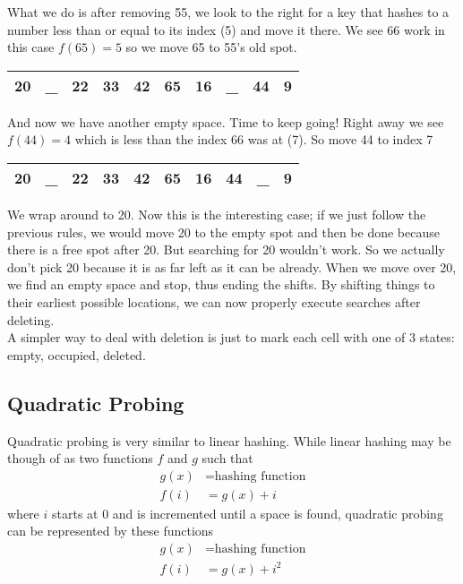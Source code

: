 \documentclass[11pt]{book}
\begin{document}
		\noindent What we do is after removing 55, we look to the right for a key that
		hashes to a number less than or equal to its index (5) and move it there. We
		see 66 work in this case $f(65) = 5$ so we move 65 to 55's old spot.
		\begin{center}
			\begin{tabular}{|c|c|c|c|c|c|c|c|c|c|}
				\hline
				20 & \_ & 22 & 33 & 42 & 65 & 16 & \_ & 44 & 9 \\
				\hline
			\end{tabular}
		\end{center}
		And now we have another empty space. Time to keep going! Right away we see
		$f(44) = 4$ which is less than the index 66 was at (7). So move 44 to index 7
		\begin{center}
			\begin{tabular}{|c|c|c|c|c|c|c|c|c|c|}
				\hline
				20 & \_ & 22 & 33 & 42 & 65 & 16 & 44 & \_ & 9 \\
				\hline
			\end{tabular}
		\end{center}
		We wrap around to 20. Now this is the interesting case; if we just follow the
		previous rules, we would move 20 to the empty spot and then be done because there
		is a free spot after 20. But searching for 20 wouldn't work. So we actually don't
		pick 20 because it is as far left as it can be already. When we move over 20, we
		find an empty space and stop, thus ending the shifts. By shifting things to their
		earliest possible locations, we can now properly execute searches after
		deleting. \\

		\noindent A simpler way to deal with deletion is just to mark each cell with one
		of 3 states: empty, occupied, deleted.

	\subsection{Quadratic Probing}
		Quadratic probing is very similar to linear hashing. While linear hashing may
		be though of as two functions $f$ and $g$ such that
		\begin{align*}
			g(x) &= \text{hashing function} \\
			f(i) &= g(x) + i
		\end{align*}
		where $i$ starts at 0 and is incremented until a space is found, quadratic probing
		can be represented by these functions
		\begin{align*}
			g(x) &= \text{hashing function} \\
			f(i) &= g(x) + i^2
		\end{align*}
\end{document}
